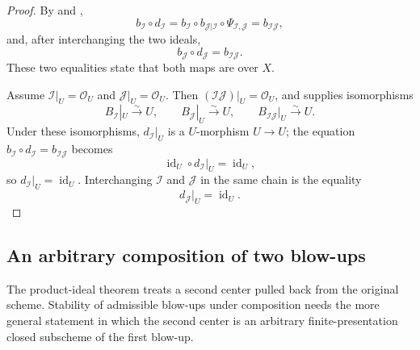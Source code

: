 \begin{proof}
  By  and
  ,
  \[
    b_{\mathcal I}\circ d_{\mathcal I}
      =b_{\mathcal I}\circ b_{\mathcal J|\mathcal I}
        \circ\Psi_{\mathcal I,\mathcal J}
      =b_{\mathcal I\mathcal J},
  \]
  and, after interchanging the two ideals,
  \[
    b_{\mathcal J}\circ d_{\mathcal J}=b_{\mathcal I\mathcal J}.
  \]
  These two equalities state that both maps are over $X$.

  Assume $\mathcal I|_U=\mathcal O_U$ and
  $\mathcal J|_U=\mathcal O_U$.  Then
  $(\mathcal I\mathcal J)|_U=\mathcal O_U$, and
   supplies isomorphisms
  \[
    B_{\mathcal I}|_U\xrightarrow{\sim}U,\qquad
    B_{\mathcal J}|_U\xrightarrow{\sim}U,\qquad
    B_{\mathcal I\mathcal J}|_U\xrightarrow{\sim}U.
  \]
  Under these isomorphisms, $d_{\mathcal I}|_U$ is a $U$-morphism
  $U\to U$; the equation
  $b_{\mathcal I}\circ d_{\mathcal I}=b_{\mathcal I\mathcal J}$ becomes
  \[
    \operatorname{id}_U\circ d_{\mathcal I}|_U=\operatorname{id}_U,
  \]
  so $d_{\mathcal I}|_U=\operatorname{id}_U$.  Interchanging
  $\mathcal I$ and $\mathcal J$ in the same chain is the equality
  \[
    d_{\mathcal J}|_U=\operatorname{id}_U.
  \]
\end{proof}


\subsection{An arbitrary composition of two blow-ups}

The product-ideal theorem treats a second center pulled back from the original
scheme.  Stability of admissible blow-ups under composition needs the more
general statement in which the second center is an arbitrary finite-presentation
closed subscheme of the first blow-up.

